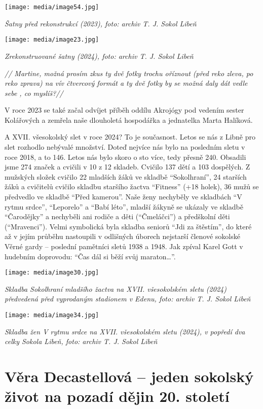 \texttt{[image: media/image54.jpg]}

\emph{Šatny před rekonstrukcí (2023), foto: archiv T. J. Sokol Libeň}

\texttt{[image: media/image23.jpg]}

\emph{Zrekonstruované šatny (2024), foto: archiv T. J. Sokol Libeň}

\emph{// Martine, možná prosím zkus ty dvě fotky trochu oříznout (před
reko zleva, po reko zprava) na vív čtvercový formát a ty dvě fotky by se
možná daly dát vedle sebe , co myslíš?//}

V roce 2023 se také začal odvíjet příběh oddílu Akrojógy pod vedením
sester Kolářových a zemřela naše dlouholetá hospodářka a jednatelka
Marta Halíková.

A XVII. všesokolský slet v roce 2024? To je současnost. Letos se nás z
Libně pro slet rozhodlo nebývalé množství. Doteď nejvíce nás bylo na
posledním sletu v roce 2018, a to 146. Letos nás bylo skoro o sto více,
tedy přesně 240. Obsadili jsme 274 značek a cvičili v 10 z 12 skladeb.
Cvičilo 137 dětí a 103 dospělých. Z mužských složek cvičilo 22 mladších
žáků ve skladbě ``Sokolhraní'', 24 starších žáků a cvičitelů cvičilo
skladbu staršího žactva ``Fitness'' (+18 holek), 36 mužů se předvedlo ve
skladbě ``Před kamerou''. Naše ženy nechyběly ve skladbách ``V rytmu
srdce'', ``Leporelo'' a ``Babí léto'', mladší žákyně se ukázaly ve
skladbě ``Čarodějky'' a nechyběli ani rodiče a děti (``Čmeláčci'') a
předškolní děti (``Mravenci''). Velmi symbolická byla skladba seniorů
``Jdi za štěstím'', do které až v jejím průběhu nastoupili v odlišných
úborech nejstarší členové sokolské Věrné gardy -- poslední pamětníci
sletů 1938 a 1948. Jak zpíval Karel Gott v hudebním doprovodu: ``Čas dál
si běží svůj maraton\ldots''.

\texttt{[image: media/image30.jpg]}

\emph{Skladba Sokolhraní mladšího žactva na XVII. všesokolském sletu
(2024) předvedená před vyprodaným stadionem v Edenu, foto: archiv T. J.
Sokol Libeň}

\texttt{[image: media/image34.jpg]}

\emph{Skladba žen V rytmu srdce na XVII. všesokolském sletu (2024), v
popředí dva celky Sokola Libeň, foto: archiv T. J. Sokol Libeň}

\section{Věra Decastellová -- jeden sokolský život na pozadí dějin 20.
století}\label{vux11bra-decastellovuxe1-jeden-sokolskuxfd-ux17eivot-na-pozaduxed-dux11bjin-20.-stoletuxed}


